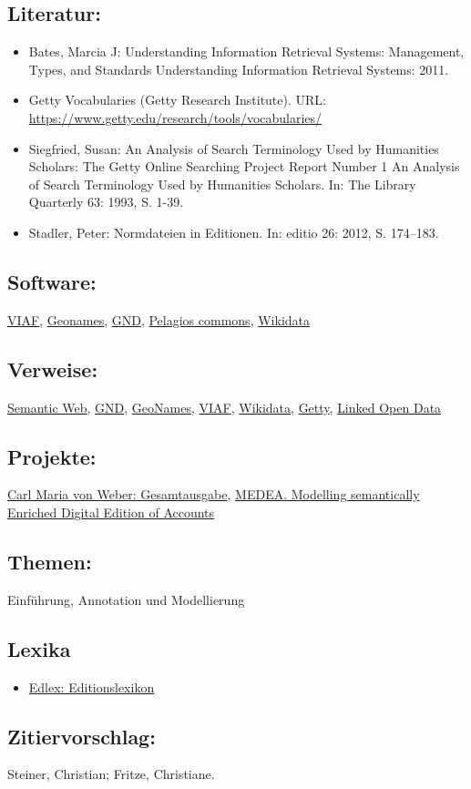 \documentclass{article}
\begin{document}
        \subsection*{Literatur:}\begin{itemize}\item Bates, Marcia J: Understanding Information Retrieval Systems: Management, Types, and Standards Understanding Information Retrieval Systems: 2011.\item Getty Vocabularies (Getty Research Institute). URL: \url{https://www.getty.edu/research/tools/vocabularies/}\item Siegfried, Susan: An Analysis of Search Terminology Used by Humanities Scholars: The Getty Online Searching Project Report Number 1 An Analysis of Search Terminology Used by Humanities Scholars. In: The Library Quarterly 63: 1993, S. 1-39.\item Stadler, Peter: Normdateien in Editionen. In: editio 26: 2012, S. 174–183.\end{itemize}\subsection*{Software:}\href{https://viaf.org}{VIAF}, \href{geonames.org}{Geonames}, \href{http://www.dnb.de/DE/Standardisierung/GND/gnd_node.html}{GND}, \href{http://commons.pelagios.org/}{Pelagios commons}, \href{https://www.wikidata.org/wiki/Wikidata:Main_Page}{Wikidata}\subsection*{Verweise:}\href{https://gams.uni-graz.at/o:konde.167}{Semantic Web}, \href{https://gams.uni-graz.at/o:konde.109}{GND}, \href{https://gams.uni-graz.at/o:konde.107}{GeoNames}, \href{https://gams.uni-graz.at/o:konde.111}{VIAF}, \href{https://gams.uni-graz.at/o:konde.112}{Wikidata}, \href{https://gams.uni-graz.at/o:konde.108}{Getty}, \href{https://gams.uni-graz.at/o:konde.8}{Linked Open Data}\subsection*{Projekte:}\href{https://weber-gesamtausgabe.de/de/Index}{Carl Maria von Weber: Gesamtausgabe}, \href{https://medea.hypotheses.org}{MEDEA. Modelling semantically Enriched Digital Edition of Accounts}\subsection*{Themen:}Einführung, Annotation und Modellierung\subsection*{Lexika}\begin{itemize}\item \href{https://edlex.de/index.php?title=Normdaten}{Edlex: Editionslexikon}\end{itemize}\subsection*{Zitiervorschlag:}Steiner, Christian; Fritze, Christiane. 
\end{document}
